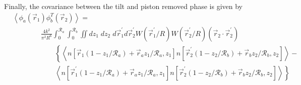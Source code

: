 Finally, the covariance between the tilt and piston removed phase is given by 
\begin{equation}\label{tprphase_n}
\begin{aligned}
&\left\langle \phi_{a}\left(\vec{r}_{1}\right) \phi^{T}_{b}\left(\vec{r}_{2}\right)\right\rangle = \\
&\quad\quad\quad\quad
\frac{4 k^{2}}{\pi^{2}R^{6}} \int_{0}^{\mathcal{R}_{a}}  \int_{0}^{\mathcal{R}_{b}} \iint dz_{1} \; dz_{2} \; d\vec{r}^{\prime}_{1}d\vec{r}^{\prime}_{2} W(\vec{r}^{\prime}_{1}/R) W(\vec{r}^{\prime}_{2}/R)
\left(\vec{r}_{2} \cdot \vec{r}^{\prime}_{2}\right)
\\
&\quad\quad\quad\quad\quad\quad
\left\{
\left\langle n\left[\vec{r}_{1}\left(1-z_{1}/\mathcal{R}_{a}\right) + \vec{r}_{a} z_{1}/\mathcal{R}_{a}, z_{1}\right]
 n\left[\vec{r}^{\prime}_{2}\left(1-z_{2}/\mathcal{R}_{b}\right) + \vec{r}_{b} z_{2}/\mathcal{R}_{b}, z_{2}\right] \right\rangle - 
\right.
\\
&\quad\quad\quad\quad\quad\quad
\left.
\left\langle n\left[\vec{r}^{\prime}_{1}\left(1-z_{1}/\mathcal{R}_{a}\right) + \vec{r}_{a} z_{1}/\mathcal{R}_{a}, z_{1}\right]
 n\left[\vec{r}^{\prime}_{2}\left(1-z_{2}/\mathcal{R}_{b}\right) + \vec{r}_{b} z_{2}/\mathcal{R}_{b}, z_{2}\right] \right\rangle
\right\}
\end{aligned}
\end{equation}


